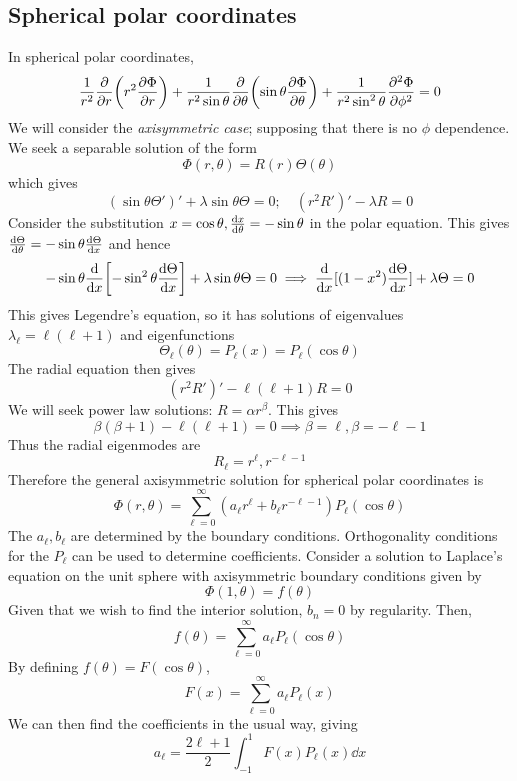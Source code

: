 \subsection{Spherical polar coordinates}
In spherical polar coordinates,
\[ \frac{1}{r^2} \pdv{r} \qty(r^2 \pdv{\Phi}{r}) + \frac{1}{r^2 \sin\theta}\pdv{\theta} \qty(\sin\theta \pdv{\Phi}{\theta}) + \frac{1}{r^2 \sin^2 \theta} \pdv[2]{\Phi}{\phi} = 0 \]
We will consider the \textit{axisymmetric case}; supposing that there is no \( \phi \) dependence.
We seek a separable solution of the form
\[ \Phi(r,\theta) = R(r) \Theta(\theta) \]
which gives
\[ (\sin\theta \Theta')' + \lambda \sin\theta \Theta = 0;\quad (r^2R')' - \lambda R = 0 \]
Consider the substitution \( x = \cos\theta, \dv{x}{\theta} = -\sin\theta \) in the polar equation.
This gives \( \dv{\Theta}{\theta} = -\sin\theta \dv{\Theta}{x} \) and hence
\[ -\sin\theta \dv{x}\qty[-\sin^2\theta \dv{\Theta}{x}] + \lambda \sin\theta \Theta = 0 \implies \dv{x}[(1-x^2)\dv{\Theta}{x}] + \lambda \Theta = 0 \]
This gives Legendre's equation, so it has solutions of eigenvalues \( \lambda_\ell = \ell (\ell + 1) \) and eigenfunctions
\[ \Theta_\ell(\theta) = P_\ell(x) = P_\ell(\cos\theta) \]
The radial equation then gives
\[ (r^2 R')' - \ell (\ell + 1) R = 0 \]
We will seek power law solutions: \( R = \alpha r^\beta \).
This gives
\[ \beta(\beta + 1) - \ell(\ell + 1) = 0 \implies \beta = \ell, \beta = -\ell - 1 \]
Thus the radial eigenmodes are
\[ R_\ell = r^{\ell}, r^{-\ell - 1} \]
Therefore the general axisymmetric solution for spherical polar coordinates is
\[ \Phi(r,\theta) = \sum_{\ell = 0}^\infty (a_\ell r^{\ell} + b_\ell r^{-\ell - 1}) P_\ell(\cos\theta) \]
The \( a_\ell, b_\ell \) are determined by the boundary conditions.
Orthogonality conditions for the \( P_\ell \) can be used to determine coefficients.
Consider a solution to Laplace's equation on the unit sphere with axisymmetric boundary conditions given by
\[ \Phi(1,\theta) = f(\theta) \]
Given that we wish to find the interior solution, \( b_n = 0 \) by regularity.
Then,
\[ f(\theta) = \sum_{\ell=0}^\infty a_\ell P_\ell(\cos\theta) \]
By defining \( f(\theta) = F(\cos\theta) \),
\[ F(x) = \sum_{\ell=0}^\infty a_\ell P_\ell(x) \]
We can then find the coefficients in the usual way, giving
\[ a_\ell = \frac{2\ell + 1}{2} \int_{-1}^1 F(x) P_{\ell}(x) \dd{x} \]

